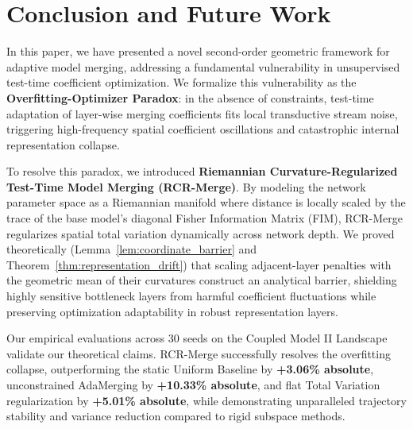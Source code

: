 \section{Conclusion and Future Work}
\label{sec:conclusion}

In this paper, we have presented a novel second-order geometric framework for adaptive model merging, addressing a fundamental vulnerability in unsupervised test-time coefficient optimization. We formalize this vulnerability as the \textbf{Overfitting-Optimizer Paradox}: in the absence of constraints, test-time adaptation of layer-wise merging coefficients fits local transductive stream noise, triggering high-frequency spatial coefficient oscillations and catastrophic internal representation collapse. 

To resolve this paradox, we introduced \textbf{Riemannian Curvature-Regularized Test-Time Model Merging (RCR-Merge)}. By modeling the network parameter space as a Riemannian manifold where distance is locally scaled by the trace of the base model's diagonal Fisher Information Matrix (FIM), RCR-Merge regularizes spatial total variation dynamically across network depth. We proved theoretically (Lemma~\ref{lem:coordinate_barrier} and Theorem~\ref{thm:representation_drift}) that scaling adjacent-layer penalties with the geometric mean of their curvatures construct an analytical barrier, shielding highly sensitive bottleneck layers from harmful coefficient fluctuations while preserving optimization adaptability in robust representation layers. 

Our empirical evaluations across 30 seeds on the Coupled Model II Landscape validate our theoretical claims. RCR-Merge successfully resolves the overfitting collapse, outperforming the static Uniform Baseline by \textbf{+3.06\% absolute}, unconstrained AdaMerging by \textbf{+10.33\% absolute}, and flat Total Variation regularization by \textbf{+5.01\% absolute}, while demonstrating unparalleled trajectory stability and variance reduction compared to rigid subspace methods. 

